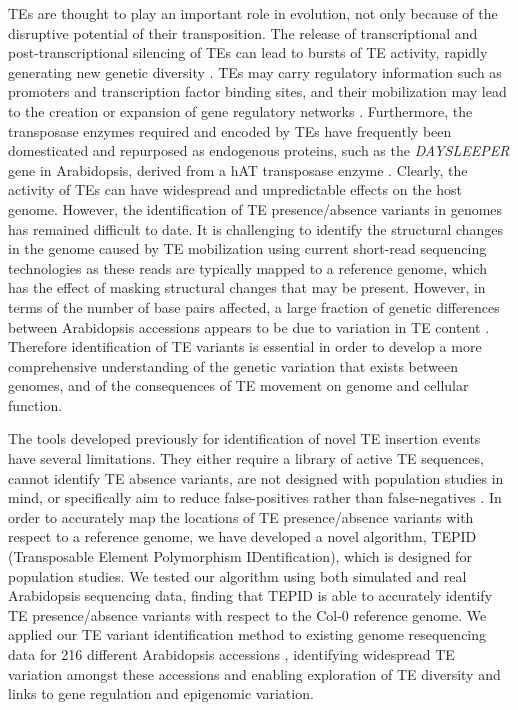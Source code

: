 \documentclass[12pt]{article}
\begin{document}
TEs are thought to play an important role in evolution, not only because
of the disruptive potential of their transposition. The release of
transcriptional and post-transcriptional silencing of TEs can lead to
bursts of TE activity, rapidly generating new genetic diversity
\cite{Vitte:2014he}. TEs may carry regulatory information such as
promoters and transcription factor binding sites, and their mobilization
may lead to the creation or expansion of gene regulatory networks
\cite{Henaff:2014hg, Bolger:2014bn, Ito:2011dga, Makarevitch:2015ho}.
Furthermore, the transposase enzymes required and encoded by TEs have
frequently been domesticated and repurposed as endogenous proteins, such
as the \emph{DAYSLEEPER} gene in Arabidopsis, derived from a hAT
transposase enzyme \cite{Bundock:2005gp}. Clearly, the activity of TEs
can have widespread and unpredictable effects on the host genome.
However, the identification of TE presence/absence variants in genomes
has remained difficult to date. It is challenging to identify the
structural changes in the genome caused by TE mobilization using current
short-read sequencing technologies as these reads are typically mapped
to a reference genome, which has the effect of masking structural
changes that may be present. However, in terms of the number of base
pairs affected, a large fraction of genetic differences between
Arabidopsis accessions appears to be due to variation in TE content
\cite{Cao:2011cf, Quadrana:2016bi}. Therefore identification of TE
variants is essential in order to develop a more comprehensive
understanding of the genetic variation that exists between genomes, and
of the consequences of TE movement on genome and cellular function.

The tools developed previously for identification of novel TE
insertion events have several limitations. They either require a
library of active TE sequences, cannot identify TE absence variants,
are not designed with population studies in mind, or specifically aim
to reduce false-positives rather than false-negatives
\cite{Thung:2014ir, Robb:2013gw, Henaff:2015dl, Quadrana:2016bi}. In
order to accurately map the locations of TE presence/absence variants
with respect to a reference genome, we have developed a novel
algorithm, TEPID (Transposable Element Polymorphism IDentification),
which is designed for population studies. We tested our algorithm
using both simulated and real Arabidopsis sequencing data, finding
that TEPID is able to accurately identify TE presence/absence variants
with respect to the Col-0 reference genome. We applied our TE variant
identification method to existing genome resequencing data for 216
different Arabidopsis accessions \cite{Schmitz:2013iu}, identifying
widespread TE variation amongst these accessions and enabling
exploration of TE diversity and links to gene regulation and
epigenomic variation.
\end{document}
